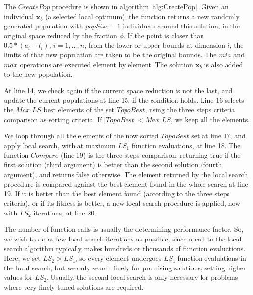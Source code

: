


The $CreatePop$ procedure is shown in algorithm \ref{alg:CreatePop}. Given an individual $\bm{x}_b$ (a selected local optimum), the function returns a new randomly generated population with $popSize-1$ individuals around this solution, in the original space reduced by the fraction $\phi$. If the point is closer than $0.5 * (u_i - l_i), \ i = 1, ..., n$, from the lower or upper bounds at dimension $i$, the limits of that new population are taken to be the original bounds. The $min$ and $max$ operations are executed element by element. The solution $\bm{x}_b$ is also added to the new population.


At line 14, we check again if the current space reduction is not the last, and update the current populations at line 15, if the condition holds. Line 16 selects the $Max\_LS$ best elements of the set $TopoBest$, using the three steps criteria comparison as sorting criteria. If $|TopoBest| < Max\_LS$, we keep all the elements.

We loop through all the elements of the now sorted $TopoBest$ set at line 17, and apply local search, with at maximum $LS_1$ function evaluations, at line 18. The function $Compare$ (line 19) is the three steps comparison, returning true if the first solution (third argument) is better than the second solution (fourth argument), and returns false otherwise. The element returned by the local search procedure is compared against the best element found in the whole search at line 19. If it is better than the best element found (according to the three steps criteria), or if its fitness is better, a new local search procedure is applied, now with $LS_2$ iterations, at line 20.


The number of function calls is usually the determining performance factor. So, we wish to do as few local search iterations as possible, since a call to the local search algorithm typically makes hundreds or thousands of function evaluations. Here, we set $LS_2 > LS_1$, so every element undergoes $LS_1$ function evaluations in the local search, but we only search finely for promising solutions, setting higher values for $LS_2$. Usually, the second local search is only necessary for problems where very finely tuned solutions are required.

